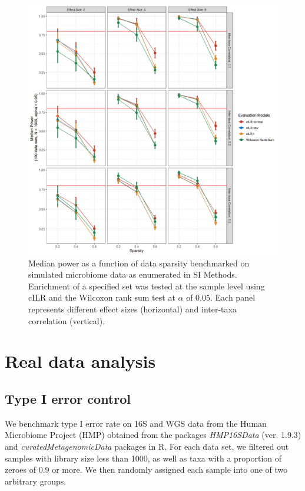 \documentclass{article}
\begin{document}
\begin{figure}[H]
    \centering
    \includegraphics[scale=0.5]{figures/pwr_single_sample.png}
    \caption{Median power as a function of data sparsity benchmarked on simulated microbiome data as enumerated in SI Methods. Enrichment of a specified set was tested at the sample level using cILR and the Wilcoxon rank sum test at $\alpha$ of 0.05. Each panel represents different effect sizes (horizontal) and inter-taxa correlation (vertical).}
\end{figure}

\section*{Real data analysis} 
\subsection*{Type I error control}
We benchmark type I error rate on 16S and WGS data from the Human Microbiome Project (HMP) obtained from the packages \emph{HMP16SData} (ver. 1.9.3) and \emph{curatedMetagenomicData} packages in R. For each data set, we filtered out samples with library size less than 1000, as well as taxa with a proportion of zeroes of 0.9 or more. We then randomly assigned each sample into one of two arbitrary groups.  \\

\newpage
{}

\end{document}
